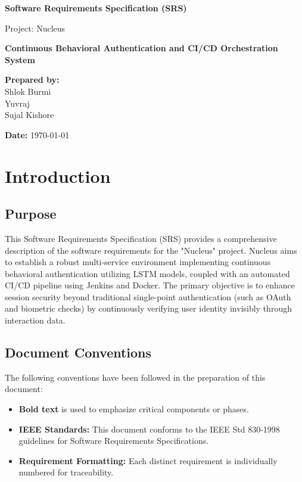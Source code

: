 \documentclass[12pt, a4paper]{article}
\begin{document}
\begin{titlepage}
    \centering
    \vspace*{2cm}
    
    \Huge
    \textbf{Software Requirements Specification (SRS)}
    
    \vspace{0.5cm}
    \LARGE
    Project: Nucleus
    
    \vspace{1.5cm}
    
    \textbf{Continuous Behavioral Authentication and CI/CD Orchestration System}
    
    \vspace{2cm}
    
    \Large
    \textbf{Prepared by:} \\
    Shlok Burmi \\
    Yuvraj \\
    Sujal Kishore \\
    
    \vfill
    
    \Large
    \textbf{Date:} \today \\
    
\end{titlepage}

\tableofcontents
\newpage
\listoffigures
\newpage
\listoftables
\newpage

\section{Introduction}
\subsection{Purpose}
This Software Requirements Specification (SRS) provides a comprehensive description of the software requirements for the "Nucleus" project. Nucleus aims to establish a robust multi-service environment implementing continuous behavioral authentication utilizing LSTM models, coupled with an automated CI/CD pipeline using Jenkins and Docker. The primary objective is to enhance session security beyond traditional single-point authentication (such as OAuth and biometric checks) by continuously verifying user identity invisibly through interaction data.

\subsection{Document Conventions}
The following conventions have been followed in the preparation of this document:
\begin{itemize}
    \item \textbf{Bold text} is used to emphasize critical components or phases.
    \item \textbf{IEEE Standards:} This document conforms to the IEEE Std 830-1998 guidelines for Software Requirements Specifications.
    \item \textbf{Requirement Formatting:} Each distinct requirement is individually numbered for traceability.
\end{itemize}
\end{document}
